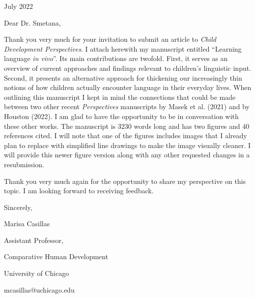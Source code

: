 \documentclass[a4paper]{article}
\begin{document}
 July 2022

\vspace{1 cm}

\noindent Dear Dr. Smetana,

\medskip
\medskip

Thank you very much for your invitation to submit an article to \textit{Child Development Perspectives}. I attach herewith my manuscript entitled ``Learning language \textit{in vivo}''. Its main contributions are twofold. First, it serves as an overview of current approaches and findings relevant to children's linguistic input. Second, it presents an alternative approach for thickening our increasingly thin notions of how children actually encounter language in their everyday lives. When outlining this manuscript I kept in mind the connections that could be made between two other recent \textit{Perspectives} manuscripts by Masek et al. (2021) and by Houston (2022). I am glad to have the opportunity to be in conversation with these other works. The manuscript is 3230 words long and has two figures and 40 references cited. I will note that one of the figures includes images that I already plan to replace with simplified line drawings to make the image visually cleaner. I will provide this newer figure version along with any other requested changes in a resubmission.

\medskip

Thank you very much again for the opportunity to share my perspective on this topic. I am looking forward to receiving feedback.

\bigskip
\bigskip
\bigskip

\noindent Sincerely,
\bigskip
\bigskip
\bigskip
\bigskip

\noindent Marisa Casillas

\noindent Assistant Professor,

\noindent Comparative Human Development

\noindent University of Chicago

\noindent mcasillas$@$uchicago.edu
\end{document}
